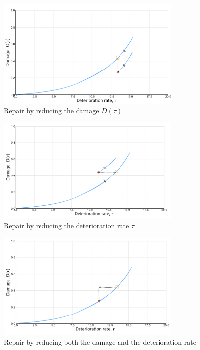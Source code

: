 \begin{figure}[H]
    \centering
    \includegraphics[width=0.8\textwidth]{Figures/repair1.jpg}
    \caption{Repair by reducing the damage $D(\tau)$}
    \label{repair1}
\end{figure}

\begin{figure}[H]
    \centering
    \includegraphics[width=0.8\textwidth]{Figures/repair2.png}
    \caption{Repair by reducing the deterioration rate $\tau$}
    \label{repair2}
\end{figure}

\begin{figure}[H]
    \centering
    \includegraphics[width=0.8\textwidth]{Figures/repair3.jpg}
    \caption{Repair by reducing both the damage and the deterioration rate}
    \label{repair3}
\end{figure}

